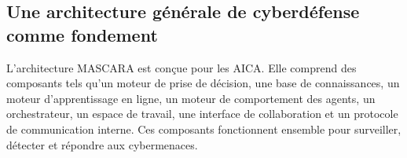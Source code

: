 \subsection{Une architecture générale de cyberdéfense comme fondement}

L'architecture MASCARA est conçue pour les AICA. Elle comprend des composants tels qu'un moteur de prise de décision, une base de connaissances, un moteur d'apprentissage en ligne, un moteur de comportement des agents, un orchestrateur, un espace de travail, une interface de collaboration et un protocole de communication interne. Ces composants fonctionnent ensemble pour surveiller, détecter et répondre aux cybermenaces.
%


